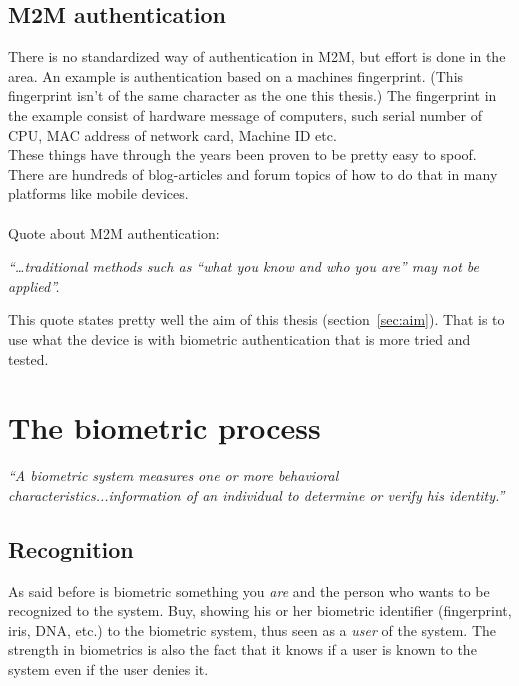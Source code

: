 \subsection{M2M authentication}
There is no standardized way of authentication in M2M, but effort is done in the area. An example is authentication based on a machines fingerprint. (This fingerprint isn't of the same character as the one this thesis.)  The fingerprint in the example  consist of hardware message of computers, such serial number of CPU, MAC address of network card, Machine ID etc. \cite[]{auth:M2M} \\
These things have through the years been proven to be pretty easy to spoof. There are hundreds of blog-articles and forum topics of how to do that in many platforms like mobile devices. \\
\\
Quote about M2M authentication:
\begin{center} 
\textit{``\dots traditional methods such as “what you know and who you are” may not be applied''.}
\end{center}
\cite[]{auth:M2Mcom}
This quote states pretty well the aim of this thesis (section~\ref{sec:aim}). That is to use what the device is with biometric authentication that is more  tried and tested.


\section{The biometric process}\label{sec:biometric}
\begin{center}\textit{``A biometric system measures one or more behavioral characteristics...information of an individual to determine or verify his identity.''} \cite[p.~3]{introbio}\end{center}

\subsection{Recognition}
As said before is biometric something you \textit{are} and the person who wants to be recognized to the system. Buy, showing his or her biometric identifier (fingerprint, iris, DNA, etc.) to the biometric system, thus seen as a \textit{user} of the system. The strength in biometrics is also the fact that it knows if a user is known to the system even if the user denies it. \cite[ch.~1]{introbio}

